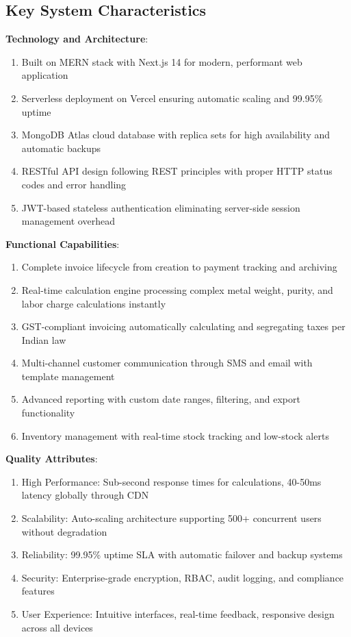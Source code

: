 \documentclass[12pt,a4paper]{report}
\begin{document}
\subsection{Key System Characteristics}

\textbf{Technology and Architecture}:
\begin{enumerate}[label=\roman*)]
    \item Built on MERN stack with Next.js 14 for modern, performant web application
    \item Serverless deployment on Vercel ensuring automatic scaling and 99.95\% uptime
    \item MongoDB Atlas cloud database with replica sets for high availability and automatic backups
    \item RESTful API design following REST principles with proper HTTP status codes and error handling
    \item JWT-based stateless authentication eliminating server-side session management overhead
\end{enumerate}

\textbf{Functional Capabilities}:
\begin{enumerate}[label=\roman*)]
    \item Complete invoice lifecycle from creation to payment tracking and archiving
    \item Real-time calculation engine processing complex metal weight, purity, and labor charge calculations instantly
    \item GST-compliant invoicing automatically calculating and segregating taxes per Indian law
    \item Multi-channel customer communication through SMS and email with template management
    \item Advanced reporting with custom date ranges, filtering, and export functionality
    \item Inventory management with real-time stock tracking and low-stock alerts
\end{enumerate}

\textbf{Quality Attributes}:
\begin{enumerate}[label=\roman*)]
    \item High Performance: Sub-second response times for calculations, 40-50ms latency globally through CDN
    \item Scalability: Auto-scaling architecture supporting 500+ concurrent users without degradation
    \item Reliability: 99.95\% uptime SLA with automatic failover and backup systems
    \item Security: Enterprise-grade encryption, RBAC, audit logging, and compliance features
    \item User Experience: Intuitive interfaces, real-time feedback, responsive design across all devices
\end{enumerate}
\end{document}
